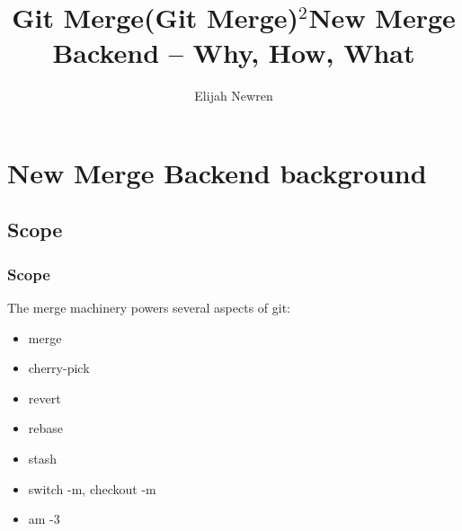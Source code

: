 \documentclass[compress,t]{beamer}
\title{Git Merge}
\author{Elijah Newren}
\institute{Palantir Technologies}
\date{}
\begin{document}

\begin{frame}
  \titlepage
\end{frame}

\ifx\handout\undefined
\title{(Git Merge)$^2$}
\begin{frame}
  \titlepage
\end{frame}

\title{New Merge Backend -- Why, How, What}
\begin{frame}
  \titlepage
\end{frame}
\fi

\section[Background]{New Merge Backend background}
\subsection{Scope}

\begin{frame}
  \frametitle{Scope}

  The merge machinery powers several aspects of git:

  \begin{itemize}
    \item merge
    \item cherry-pick
    \item revert
    \item rebase
    \item stash
    \item switch -m, checkout -m
    \item am -3
  \end{itemize}


\end{frame}
\end{document}
